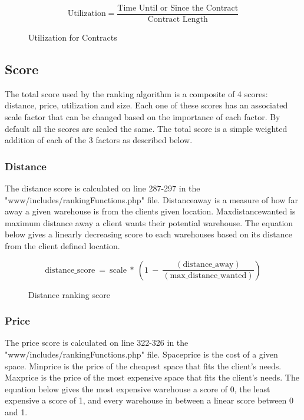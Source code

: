 \begin{figure}[h]
\[\text{Utilization} = \frac{\text{Time Until or Since the Contract}}{\text{Contract Length}}\]
\caption{Utilization for Contracts}
\label{fig:utilization}
\end{figure}


\subsection{Score}

The total score used by the ranking algorithm is a composite of 4 scores: distance, price, utilization and size.  Each one of these scores has an associated scale factor that can be changed based on the importance of each factor.  By default all the scores are scaled the same.  The total score is a simple weighted addition of each of the 3 factors as described below.



\subsubsection{Distance}

The distance score is calculated on line 287-297 in the "www/includes/rankingFunctions.php" file.  Distance\textunderscore away is a measure of how far away a given warehouse is from the clients given location.  Max\textunderscore distance\textunderscore wanted is maximum distance away a client wants their potential warehouse.  The equation below gives a linearly decreasing score to each warehouses based on its distance from the client defined location.  

\begin{figure}[h]
\[\mathrm{distance\_ score\ }=\mathrm{\ scale\ }\ast\ \left(1\ -\ \frac{(\mathrm{distance\_ away})}{(\mathrm{max\_ distance\_ wanted})}\right)\]
\caption{Distance ranking score}
\label{fig:dist}
\end{figure}

\subsubsection{Price}

The price score is calculated on line 322-326 in the "www/includes/rankingFunctions.php" file.  Space\textunderscore price is the cost of a given space.  Min\textunderscore price is the price of the cheapest space that fits the client's needs.  Max\textunderscore price is the price of the most expensive space that fits the client's needs.  The equation below gives the most expensive warehouse a score of 0, the least expensive a score of 1, and every warehouse in between a linear score between 0 and 1.

